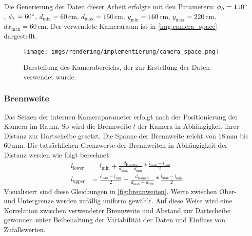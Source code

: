 
Die Generierung der Daten dieser Arbeit erfolgte mit den Parametern: $\phi_h = 110^{\circ}$, $\phi_v = 60^{\circ}$, $d_\text{min} = 60\,\text{cm}$, $d_\text{max} = 150\,\text{cm}$, $y_\text{min} = 160\,\text{cm}$, $y_\text{max} = 220\,\text{cm}$, $dx_\text{max} = 60\,\text{cm}$. Der verwendete Kameraraum ist in \autoref{img:camera_space} dargestellt.

\begin{figure}
    \centering
    \texttt{[image: imgs/rendering/implementierung/camera\_space.png]}
    \caption{Darstellung des Kamerabereichs, der zur Erstellung der Daten verwendet wurde.}
    \label{img:camera_space}
\end{figure}

\subsubsection{Brennweite}
\label{sec:brennweite}

Das Setzen der internen Kameraparameter erfolgt nach der Positionierung der Kamera im Raum. So wird die Brennweite $l$ der Kamera in Abhängigkeit ihrer Distanz zur Dartscheibe gesetzt. Die Spanne der Brennweite reicht von $18\,\text{mm}$ bis $60\,\text{mm}$. Die tatsächlichen Grenzwerte der Brennweiten in Abhängigkeit der Distanz werden wie folgt berechnet:
\begin{align*}
    l_\text{lower} & = l_\text{min} + \frac{d_\text{Kamera}}{d_\text{max} - d_\text{min}} * \frac{l_\text{max} - l_\text{min}}{2}                          \\
    l_\text{upper} & = \frac{l_\text{max} - l_\text{min}}{2} + \frac{d_\text{Kamera}}{d_\text{max} - d_\text{min}} * \frac{l_\text{max} - l_\text{min}}{2}
\end{align*}
Visualisiert sind diese Gleichungen in \autoref{fig:brennweiten}. Werte zwischen Ober- und Untergrenze werden zufällig uniform gewählt. Auf diese Weise wird eine Korrelation zwischen verwendeter Brennweite und Abstand zur Dartscheibe gewonnen unter Beibehaltung der Variabilität der Daten und Einfluss von Zufallswerten.

